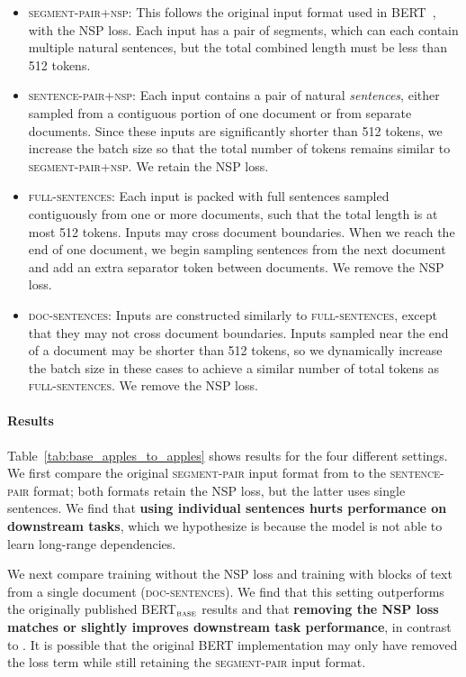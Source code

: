 \begin{itemize}[leftmargin=*]

\item \textsc{segment-pair+nsp}: This follows the original input format used in BERT~\cite{devlin2018bert}, with the NSP loss. Each input has a pair of segments, which can each contain multiple natural sentences, but the total combined length must be less than 512 tokens.
\item \textsc{sentence-pair+nsp}: Each input contains a pair of natural \emph{sentences}, either sampled from a contiguous portion of one document or from separate documents. Since these inputs are significantly shorter than 512 tokens, we increase the batch size so that the total number of tokens remains similar to \textsc{segment-pair+nsp}. We retain the NSP loss.
\item \textsc{full-sentences}: Each input is packed with full sentences sampled contiguously from one or more documents, such that the total length is at most 512 tokens. Inputs may cross document boundaries. When we reach the end of one document, we begin sampling sentences from the next document and add an extra separator token between documents. We remove the NSP loss.
\item \textsc{doc-sentences}: Inputs are constructed similarly to \textsc{full-sentences}, except that they may not cross document boundaries. Inputs sampled near the end of a document may be shorter than 512 tokens, so we dynamically increase the batch size in these cases to achieve a similar number of total tokens as \textsc{full-sentences}. We remove the NSP loss.
\end{itemize}

\paragraph{Results}

Table~\ref{tab:base_apples_to_apples} shows results for the four different settings. We first compare the original \textsc{segment-pair} input format from  to the \textsc{sentence-pair} format; both formats retain the NSP loss, but the latter uses single sentences. We find that \textbf{using individual sentences hurts performance on downstream tasks}, which we hypothesize is because the model is not able to learn long-range dependencies.

We next compare training without the NSP loss and training with blocks of text from a single document (\textsc{doc-sentences}).
We find that this setting outperforms the originally published BERT$_{\textsc{base}}$ results and that \textbf{removing the NSP loss matches or slightly improves downstream task performance}, in contrast to .
It is possible that the original BERT implementation may only have removed the loss term while still retaining the \textsc{segment-pair} input format.

